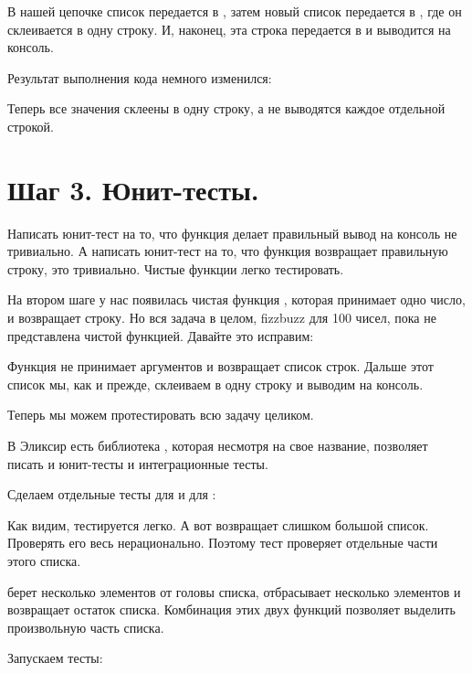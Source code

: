 В нашей цепочке список  передается в , затем новый список передается в , где он склеивается в одну строку. И, наконец, эта строка передается в  и выводится на консоль.

Результат выполнения кода немного изменился:



Теперь все значения склеены в одну строку, а не выводятся каждое отдельной строкой.

\section{Шаг 3. Юнит-тесты.}

Написать юнит-тест на то, что функция делает правильный вывод на консоль не тривиально. А написать юнит-тест на то, что функция возвращает правильную строку, это тривиально. Чистые функции легко тестировать.

На втором шаге у нас появилась чистая функция , которая принимает одно число, и возвращает строку. Но вся задача в целом, fizzbuzz для 100 чисел, пока не представлена чистой функцией. Давайте это исправим:



Функция  не принимает аргументов и возвращает список строк. Дальше этот список мы, как и прежде, склеиваем в одну строку и выводим на консоль.

Теперь мы можем протестировать всю задачу целиком.

В Эликсир есть библиотека , которая несмотря на свое название, позволяет писать и юнит-тесты и интеграционные тесты.

Сделаем отдельные тесты для  и для :



Как видим,  тестируется легко. А вот  возвращает слишком большой список. Проверять его весь нерационально. Поэтому тест проверяет отдельные части этого списка.

 берет несколько элементов от головы списка,  отбрасывает несколько элементов и возвращает остаток списка. Комбинация этих двух функций позволяет выделить произвольную часть списка.

Запускаем тесты:



